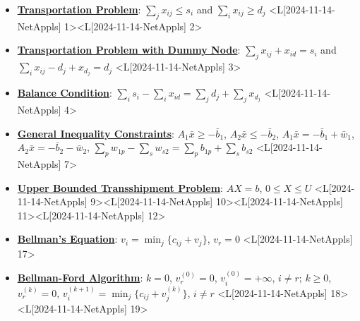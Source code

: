 \documentclass{article}%
\begin{document}
\begin{itemize}[[leftmargin=*]]%
\item \href{https://www.math.purdue.edu/~yipn/421/2024-11-14-NetAppls.pdf#page=1}{\textbf{Transportation Problem}}: $\sum_{j} x_{ij} \le s_i$ and $\sum_{i} x_{ij} \ge d_j$ <L[2024-11-14-NetAppls] 1><L[2024-11-14-NetAppls] 2>%
\item \href{https://www.math.purdue.edu/~yipn/421/2024-11-14-NetAppls.pdf#page=3}{\textbf{Transportation Problem with Dummy Node}}: $\sum_{j} x_{ij} + x_{id} = s_i$ and $\sum_{i} x_{ij} - d_j + x_{d_j} = d_j$ <L[2024-11-14-NetAppls] 3>%
\item \href{https://www.math.purdue.edu/~yipn/421/2024-11-14-NetAppls.pdf#page=4}{\textbf{Balance Condition}}: $\sum_{i} s_i - \sum_{i} x_{id} = \sum_{j} d_j + \sum_{j} x_{d_j}$ <L[2024-11-14-NetAppls] 4>%
\item \href{https://www.math.purdue.edu/~yipn/421/2024-11-14-NetAppls.pdf#page=7}{\textbf{General Inequality Constraints}}: $A_1 \bar{x} \ge -\bar{b}_1$, $A_2 \bar{x} \le -\bar{b}_2$, $A_1 \bar{x} = -\bar{b}_1 + \bar{w}_1$, $A_2 \bar{x} = -\bar{b}_2 - \bar{w}_2$, $\sum_{p} w_{1p} - \sum_{s} w_{s2} = \sum_{p} b_{1p} + \sum_{s} b_{s2}$ <L[2024-11-14-NetAppls] 7>%
\item \href{https://www.math.purdue.edu/~yipn/421/2024-11-14-NetAppls.pdf#page=9}{\textbf{Upper Bounded Transshipment Problem}}: $AX = b$, $0 \le X \le U$ <L[2024-11-14-NetAppls] 9><L[2024-11-14-NetAppls] 10><L[2024-11-14-NetAppls] 11><L[2024-11-14-NetAppls] 12>%
\item \href{https://www.math.purdue.edu/~yipn/421/2024-11-14-NetAppls.pdf#page=17}{\textbf{Bellman's Equation}}: $v_i = \min_{j} \{c_{ij} + v_j\}$, $v_r = 0$ <L[2024-11-14-NetAppls] 17>%
\item \href{https://www.math.purdue.edu/~yipn/421/2024-11-14-NetAppls.pdf#page=18}{\textbf{Bellman{-}Ford Algorithm}}: $k = 0$, $v_r^{(0)} = 0$, $v_i^{(0)} = +\infty$, $i \neq r$; $k \ge 0$, $v_r^{(k)} = 0$, $v_i^{(k+1)} = \min_j \{c_{ij} + v_j^{(k)}\}$, $i \neq r$ <L[2024-11-14-NetAppls] 18><L[2024-11-14-NetAppls] 19>%
\end{itemize}%
\end{document}
